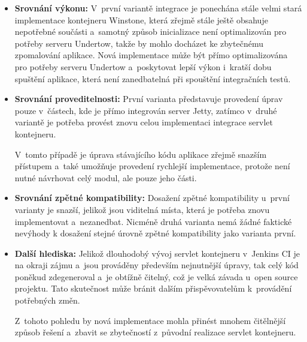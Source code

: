             \begin{itemize}
                \item{\textbf{Srovnání výkonu:} V~první variantě integrace je ponechána stále
                 velmi stará implementace kontejneru Winstone, která zřejmě stále ještě
                 obsahuje nepotřebné součásti a~samotný způsob inicializace není optimalizován
                 pro potřeby serveru Undertow, takže by mohlo docházet ke zbytečnému
                 zpomalování aplikace.
                 Nová implementace může být přímo optimalizována pro potřeby 
                 serveru Undertow a~poskytovat lepší výkon i~kratší dobu spuštění aplikace, 
                 která není zanedbatelná při spouštění integračních testů.}

                \item{\textbf{Srovnání proveditelnosti:} První varianta představuje provedení 
                    úprav pouze v~částech, kde je přímo integrován server Jetty, 
                    zatímco v~druhé variantě je potřeba provést znovu celou implementaci
                    integrace servlet kontejneru. 
                                         
                    V~tomto případě je úprava stávajícího kódu aplikace
                    zřejmě snazším přístupem a~také umožňuje provedení rychlejší
                    implementace, protože není nutné návrhovat celý modul,
                    ale pouze jeho části.}

                \item{\textbf{Srovnání zpětné kompatibility:} Dosažení zpětné kompatibility
                    u~první varianty je snazší, jelikož jsou viditelná místa, která je 
                    potřeba znovu implementovat a~nezanedbat. Nicméně druhá varianta
                    nemá žádné faktické nevýhody k dosažení 
                    stejné úrovně zpětné kompatibility jako varianta první.}

                \item{\textbf{Další hlediska:} Jelikož dlouhodobý vývoj servlet kontejneru
                    v~Jenkins CI je na okraji zájmu a~jsou prováděny především nejnutnější úpravy, 
                    tak celý kód poněkud zdegeneroval a~je obtížně čitelný, což
                    je velká závada u~open source projektu. Tato skutečnost
                    může bránit dalším přispěvovatelům k~provádění potřebných změn.

                    Z~tohoto pohledu by nová implementace mohla přinést mnohem čitělnější
                    způsob řešení a~zbavit se zbytečností z~původní realizace servlet kontejneru.}
            \end{itemize}


